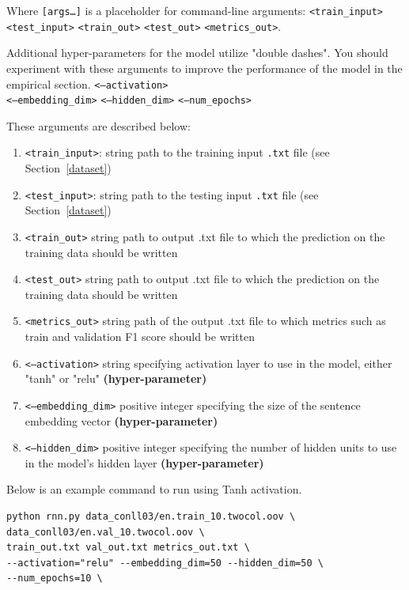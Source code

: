 \documentclass[11pt,addpoints,answers]{exam}
\begin{document}
Where \texttt{[args\dots]} is a placeholder for command-line arguments: \texttt{<train\_input>} \texttt{<test\_input>} \texttt{<train\_out>} \texttt{<test\_out>} \texttt{<metrics\_out>}. 

Additional hyper-parameters for the model utilize "double dashes". You should experiment with these arguments to improve the performance of the model in the empirical section. \texttt{<--activation>} \\ \texttt{<--embedding\_dim>} \texttt{<--hidden\_dim>} \texttt{<--num\_epochs>} 

These arguments are described below:
\begin{enumerate}
    \item \texttt{<train\_input>}: string path to the training input \texttt{.txt} file (see Section~\ref{dataset})
    \item \texttt{<test\_input>}: string path to the testing input \texttt{.txt} file (see Section~\ref{dataset})
    \item \texttt{<train\_out>} string path to output .txt file to which the prediction on the training data should be written
    \item \texttt{<test\_out>} string path to output .txt file to which the prediction on the training data should be written 
    \item \texttt{<metrics\_out>} string path of the output .txt file to which metrics such as train and validation F1 score should be written 
    \item \texttt{<--activation>} string specifying activation layer to use in the model, either "tanh" or "relu" \textbf{(hyper-parameter)}
    \item \texttt{<--embedding\_dim>} positive integer specifying the size of the sentence embedding vector \textbf{(hyper-parameter)}
    \item \texttt{<--hidden\_dim>} positive integer specifying the number of hidden units to use in the model's hidden layer \textbf{(hyper-parameter)}
\end{enumerate}

Below is an example command to run using Tanh activation.

\begin{lstlisting}
python rnn.py data_conll03/en.train_10.twocol.oov \
data_conll03/en.val_10.twocol.oov \
train_out.txt val_out.txt metrics_out.txt \
--activation="relu" --embedding_dim=50 --hidden_dim=50 \
--num_epochs=10 \
\end{lstlisting}
\vspace{0.2 in}
\end{document}
